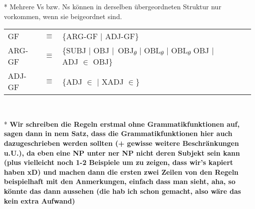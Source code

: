 \documentclass[12pt,a4paper]{article}
\begin{document}
* Mehrere Vs bzw. Ns können in derselben übergeordneten Struktur nur vorkommen, wenn sie beigeordnet sind.

\begin{singlespace}
\begin{tabular}{ l  l  l  c  c  c  c }
GF & $\equiv$ & \{ARG-GF $\mid$ ADJ-GF\} \\
ARG-GF & $\equiv$ & \{SUBJ $\mid$ OBJ $\mid$\ OBJ\textsubscript{$\theta$} $\mid$ OBL\textsubscript{$\theta$} $\mid$ OBL\textsubscript{$\theta$} OBJ $\mid$ ADJ $\in$ OBJ\} \\
ADJ-GF & $\equiv$ & \{ADJ $\in$ $\mid$ XADJ $\in$\} \\
\end{tabular}\\
\end{singlespace}


* \textbf{Wir schreiben die Regeln erstmal ohne Grammatikfunktionen auf, sagen dann in nem Satz, dass die Grammatikfunktionen hier auch dazugeschrieben werden sollten (+ gewisse weitere Beschränkungen u.U.), da eben eine NP unter ner NP nicht deren Subjekt sein kann (plus vielleicht noch 1-2 Beispiele um zu zeigen, dass wir's kapiert haben xD) und machen dann die ersten zwei Zeilen von den Regeln beispielhaft mit den Anmerkungen, einfach dass man sieht, aha, so könnte das dann aussehen (die hab ich schon gemacht, also wäre das kein extra Aufwand)}
\end{document}
